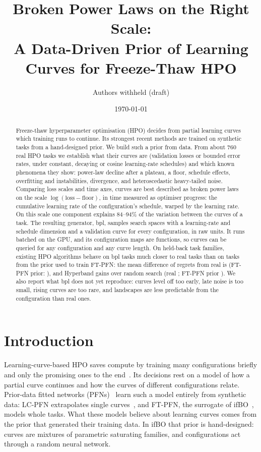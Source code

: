 \documentclass[10pt]{article}
\title{Broken Power Laws on the Right Scale:\\A Data-Driven Prior of Learning Curves for Freeze-Thaw HPO}
\author{Authors withheld (draft)}
\date{\today}
\newcommand{\bpl}{\textsf{bpl}}
\begin{document}
\maketitle

\begin{abstract}
Freeze-thaw hyperparameter optimisation (HPO) decides from partial learning curves which training runs to
continue. Its strongest recent methods are trained on synthetic tasks from a hand-designed prior. We build such a
prior from data. From about 760 real HPO tasks we establish what their curves are (validation losses or bounded
error rates, under constant, decaying or cosine learning-rate schedules) and which known phenomena they show:
power-law decline after a plateau, a floor, schedule effects, overfitting and instabilities, divergence, and
heteroscedastic heavy-tailed noise. Comparing loss scales and time axes, curves are best described as broken power
laws on the scale $\log(\text{loss} - \text{floor})$, in time measured as optimiser progress: the cumulative
learning rate of the configuration's schedule, warped by the learning rate. On this scale one component explains
84--94\% of the variation between the curves of a task. The resulting generator, \bpl{}, samples search spaces
with a learning-rate and schedule dimension and a validation curve for every configuration, in raw units. It runs
batched on the GPU, and its configuration maps are functions, so curves can be queried for any configuration and any
curve length. On
held-back task families, existing HPO algorithms behave on \bpl{} tasks much closer to real tasks than on tasks
from the prior used to train FT-PFN: the mean difference of regrets from real is \bplMAE{} (FT-PFN prior:
\ifboMAE{}), and Hyperband gains \bplHB{} over random search (real \realHB{}; FT-PFN prior \ifboHB{}). We also
report what \bpl{} does not yet reproduce: curves level off too early, late noise is too small, rising curves are
too rare, and landscapes are less predictable from the configuration than real ones.
\end{abstract}

\section{Introduction}

Learning-curve-based HPO saves compute by training many configurations briefly and only the promising ones to
the end~\cite{swersky2014freeze,li2018hyperband,wistuba2022supervising}. Its decisions rest on a model of how a
partial curve continues and how the curves of different configurations relate. Prior-data fitted networks
(PFNs)~\cite{muller2022transformers} learn such a model entirely from synthetic data: LC-PFN extrapolates single
curves~\cite{adriaensen2023efficient}, and FT-PFN, the surrogate of ifBO~\cite{rakotoarison2024incontext}, models
whole tasks. What these models believe about learning curves comes from the prior that generated their training
data. In ifBO that prior is hand-designed: curves are mixtures of parametric saturating families, and
configurations act through a random neural network.
\end{document}
